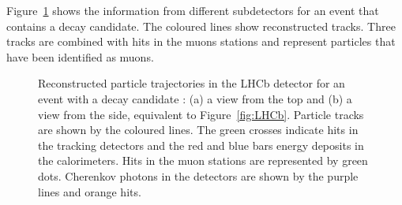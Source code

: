 Figure~\ref{fig:event} shows the information from different subdetectors for an event that contains a \BstoJpsiKK{} decay candidate. The
coloured lines show reconstructed tracks. Three tracks are combined with hits in the muons stations and represent particles that have been
identified as muons.
\begin{figure}[p]
  \centering
  \caption{Reconstructed particle trajectories in the LHCb detector for an event with a \BstoJpsiKK{} decay candidate \cite{vanEijk:2012}:
           (a) a view from the top and (b) a view from the side, equivalent to Figure~\ref{fig:LHCb}.
           Particle tracks are shown by the coloured lines. The green crosses indicate hits in the tracking detectors and the red and blue
           bars energy deposits in the calorimeters. Hits in the muon stations are represented by green dots. Cherenkov photons in the
           \rich{} detectors are shown by the purple lines and orange hits.}
  \label{fig:event}
\end{figure}
